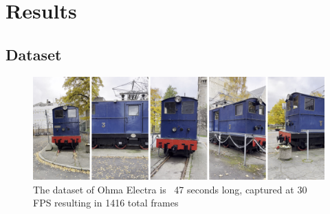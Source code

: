 \chapter{Results}

\section{Dataset}

\begin{figure}[h]
    \centering
    \includegraphics[width=1.0\textwidth]{figures/ohma_electra.png}
    \caption{The dataset of Ohma Electra is ~47 seconds long, captured at 30 FPS resulting in 1416 total frames}
    \label{fig:ohma_electra}
\end{figure}

